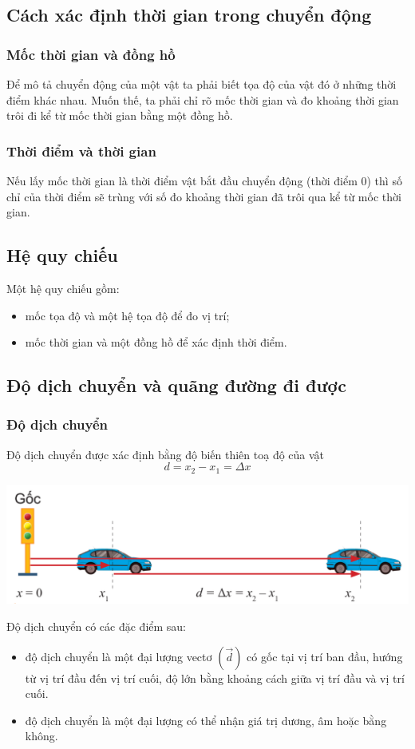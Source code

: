 \subsection{Cách xác định thời gian trong chuyển động}
\subsubsection{Mốc thời gian và đồng hồ}
Để mô tả chuyển động của một vật ta phải biết tọa độ của vật đó ở những thời điểm khác nhau. Muốn thế, ta phải chỉ rõ mốc thời gian và đo khoảng thời gian trôi đi kể từ mốc thời gian bằng một đồng hồ.
\subsubsection{Thời điểm và thời gian}
Nếu lấy mốc thời gian là thời điểm vật bắt đầu chuyển động (thời điểm 0) thì số chỉ của thời điểm sẽ trùng với số đo khoảng thời gian đã trôi qua kể từ mốc thời gian.
\subsection{Hệ quy chiếu}
Một hệ quy chiếu gồm:
\begin{itemize}
	\item mốc tọa độ và một hệ tọa độ để đo vị trí;
	\item mốc thời gian và một đồng hồ để xác định thời điểm.
\end{itemize}
\subsection{Độ dịch chuyển và quãng đường đi được}
\subsubsection{Độ dịch chuyển}
Độ dịch chuyển được xác định bằng độ biến thiên toạ độ của vật
$$d=x_2-x_1=\Delta x$$
\begin{center}
	\includegraphics[width=0.6\linewidth]{../figs/VN10-2023-PH-TP004-1}
\end{center}
Độ dịch chuyển có các đặc điểm sau:
\begin{itemize}
	\item độ dịch chuyển là một đại lượng vectơ $\left(\vec{d}\right)$ có gốc tại vị trí ban đầu, hướng từ vị trí đầu đến vị trí cuối, độ lớn bằng khoảng cách giữa vị trí đầu và vị trí cuối.
	\item độ dịch chuyển là một đại lượng có thể nhận giá trị dương, âm hoặc bằng không. 
\end{itemize}
